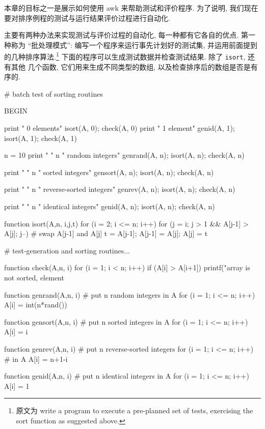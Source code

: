 本章的目标之一是展示如何使用 awk 来帮助测试和评价程序. 为了说明, 我们现在
要对排序例程的测试与运行结果评价过程进行自动化.

主要有两种办法来实现测试与评价过程的自动化, 每一种都有它各自的优点. 第一 
种称为 ``批处理模式'': 编写一个程序来运行事先计划好的测试集, 并运用前面提到
的几种排序算法.\footnote{原文为 write a program to execute a pre-planned
    set of tests, exercising the sort function as suggested
above.}
下面的程序可以生成测试数据并检查测试结果. 除了 \texttt{isort}, 还有其他
几个函数, 它们用来生成不同类型的数组, 以及检查排序后的数组是否是有序的.
\begin{awkcode}
    # batch test of sorting routines

    BEGIN {
        print "    0 elements"
        isort(A, 0); check(A, 0)
        print "    1 element"
        genid(A, 1); isort(A, 1); check(A, 1)
    
        n = 10
        print "    " n " random integers"
        genrand(A, n); isort(A, n); check(A, n)
    
        print "    " n " sorted integers"
        gensort(A, n); isort(A, n); check(A, n)
    
        print "    " n " reverse-sorted integers"
        genrev(A, n); isort(A, n); check(A, n)
    
        print "    " n " identical integers"
        genid(A, n); isort(A, n); check(A, n)
    }

    function isort(A,n,     i,j,t) {
        for (i = 2; i <= n; i++)
            for (j = i; j > 1 && A[j-1] > A[j]; j--) {
                # swap A[j-1] and A[j]
                t = A[j-1]; A[j-1] = A[j]; A[j] = t
            }
    }

\end{awkcode}
\begin{awkcode}
    # test-generation and sorting routines...

    function check(A,n,   i) {
        for (i = 1; i < n; i++)
            if (A[i] > A[i+1])
                printf("array is not sorted, element %
    }

    function genrand(A,n,  i) { # put n random integers in A
        for (i = 1; i <= n; i++)
            A[i] = int(n*rand())
    }

    function gensort(A,n,  i) { # put n sorted integers in A
        for (i = 1; i <= n; i++)
            A[i] = i
    }

    function genrev(A,n,  i) {  # put n reverse-sorted integers
        for (i = 1; i <= n; i++)  # in A
            A[i] = n+1-i
    }

    function genid(A,n,  i) {   # put n identical integers in A
        for (i = 1; i <= n; i++)
            A[i] = 1
    }
\end{awkcode}

